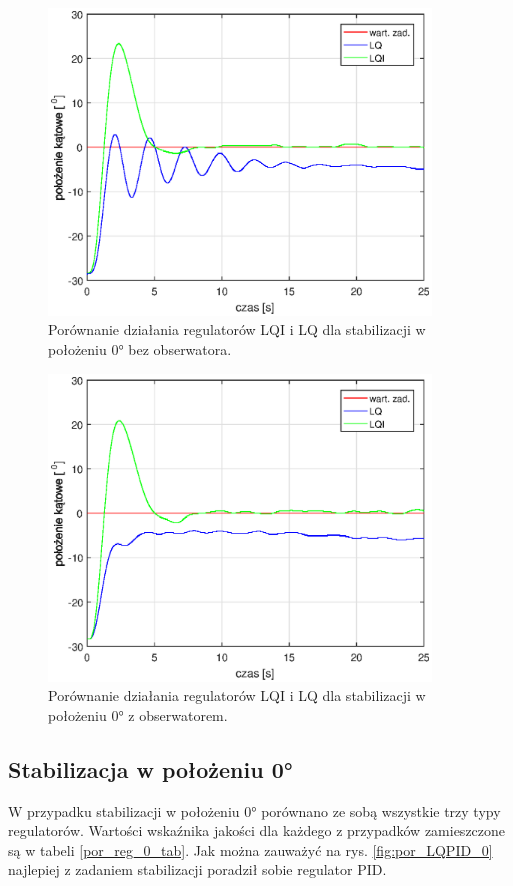 \documentclass[11pt,a4paper]{article}
\begin{document}
\begin{figure}[H]
	\centering
	\includegraphics[width=4in]{Figures/por_LQ0.eps}
	\caption{Porównanie działania regulatorów LQI i LQ dla stabilizacji w położeniu \ang{0} bez obserwatora.}
	\label{fig:por_LQ0}
\end{figure}

\begin{figure}[H]
	\centering
	\includegraphics[width=4in]{Figures/por_LQ0obs.eps}
	\caption{Porównanie działania regulatorów LQI i LQ dla stabilizacji w położeniu \ang{0} z obserwatorem.}
	\label{fig:por_LQ0obs}
\end{figure}

\subsection{Stabilizacja w położeniu \texorpdfstring{\ang{0}}{Lg}}
W przypadku stabilizacji w położeniu \ang{0} porównano ze sobą wszystkie trzy typy regulatorów. Wartości wskaźnika jakości dla każdego z przypadków zamieszczone są w tabeli \ref{por_reg_0_tab}. Jak można zauważyć na rys. \ref{fig:por_LQPID_0} najlepiej z zadaniem stabilizacji poradził sobie regulator PID. 
\end{document}
